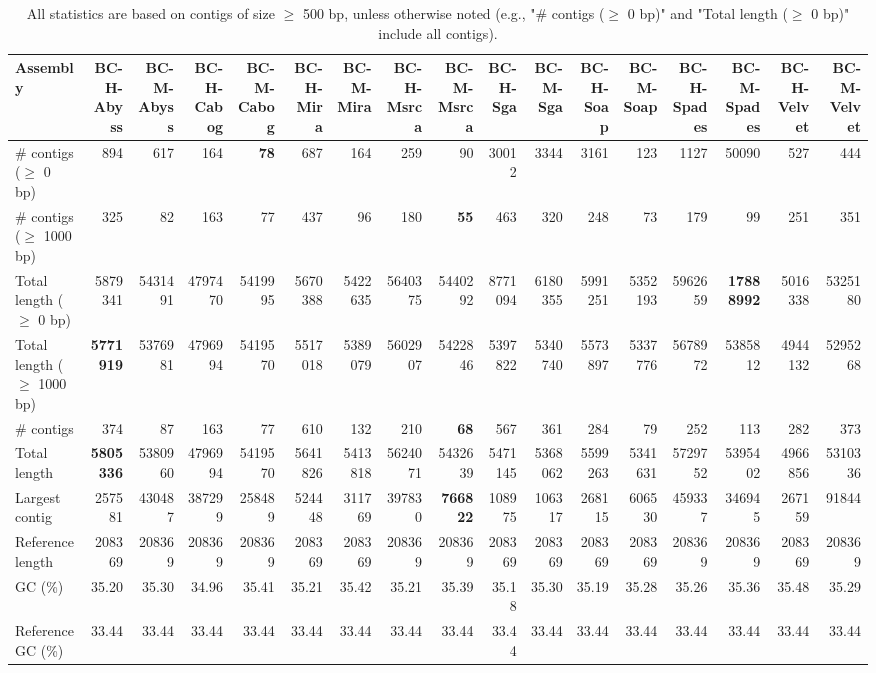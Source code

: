 \documentclass[12pt,a4paper]{article}
\begin{document}
\begin{table}[ht]
\begin{center}
\caption{All statistics are based on contigs of size $\geq$ 500 bp, unless otherwise noted (e.g., "\# contigs ($\geq$ 0 bp)" and "Total length ($\geq$ 0 bp)" include all contigs).}
\begin{tabular}{|l*{16}{|r}|}
\hline
Assembly & BC-H-Abyss & BC-M-Abyss & BC-H-Cabog & BC-M-Cabog & BC-H-Mira & BC-M-Mira & BC-H-Msrca & BC-M-Msrca & BC-H-Sga & BC-M-Sga & BC-H-Soap & BC-M-Soap & BC-H-Spades & BC-M-Spades & BC-H-Velvet & BC-M-Velvet \\ \hline
\# contigs ($\geq$ 0 bp) & 894 & 617 & 164 & {\bf 78} & 687 & 164 & 259 & 90 & 30012 & 3344 & 3161 & 123 & 1127 & 50090 & 527 & 444 \\ \hline
\# contigs ($\geq$ 1000 bp) & 325 & 82 & 163 & 77 & 437 & 96 & 180 & {\bf 55} & 463 & 320 & 248 & 73 & 179 & 99 & 251 & 351 \\ \hline
Total length ($\geq$ 0 bp) & 5879341 & 5431491 & 4797470 & 5419995 & 5670388 & 5422635 & 5640375 & 5440292 & 8771094 & 6180355 & 5991251 & 5352193 & 5962659 & {\bf 17888992} & 5016338 & 5325180 \\ \hline
Total length ($\geq$ 1000 bp) & {\bf 5771919} & 5376981 & 4796994 & 5419570 & 5517018 & 5389079 & 5602907 & 5422846 & 5397822 & 5340740 & 5573897 & 5337776 & 5678972 & 5385812 & 4944132 & 5295268 \\ \hline
\# contigs & 374 & 87 & 163 & 77 & 610 & 132 & 210 & {\bf 68} & 567 & 361 & 284 & 79 & 252 & 113 & 282 & 373 \\ \hline
Total length & {\bf 5805336} & 5380960 & 4796994 & 5419570 & 5641826 & 5413818 & 5624071 & 5432639 & 5471145 & 5368062 & 5599263 & 5341631 & 5729752 & 5395402 & 4966856 & 5310336 \\ \hline
Largest contig & 257581 & 430487 & 387299 & 258489 & 524448 & 311769 & 397830 & {\bf 766822} & 108975 & 106317 & 268115 & 606530 & 459337 & 346945 & 267159 & 91844 \\ \hline
Reference length & 208369 & 208369 & 208369 & 208369 & 208369 & 208369 & 208369 & 208369 & 208369 & 208369 & 208369 & 208369 & 208369 & 208369 & 208369 & 208369 \\ \hline
GC (\%) & 35.20 & 35.30 & 34.96 & 35.41 & 35.21 & 35.42 & 35.21 & 35.39 & 35.18 & 35.30 & 35.19 & 35.28 & 35.26 & 35.36 & 35.48 & 35.29 \\ \hline
Reference GC (\%) & 33.44 & 33.44 & 33.44 & 33.44 & 33.44 & 33.44 & 33.44 & 33.44 & 33.44 & 33.44 & 33.44 & 33.44 & 33.44 & 33.44 & 33.44 & 33.44 \\ \hline

\end{tabular}
\end{center}
\end{table}
\end{document}
